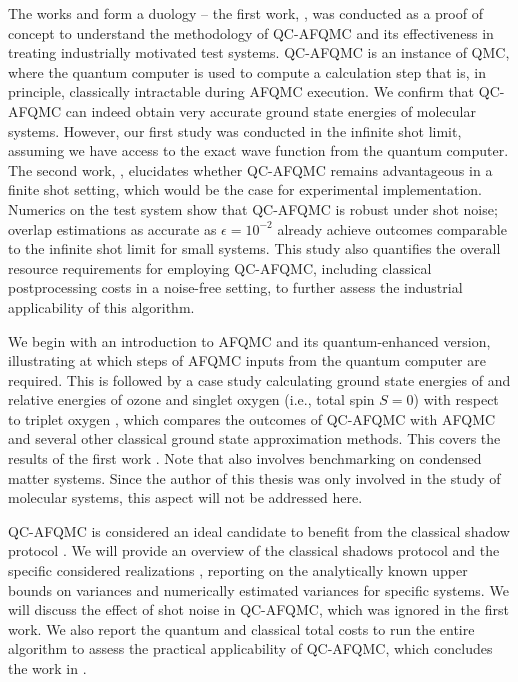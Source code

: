 \documentclass[../main.tex]{subfiles}
\begin{document}
The works \cite{amsler2023classical} and \cite{kiser2024classical} form a duology -- the first work, \cite{amsler2023classical}, was conducted as a proof of concept to understand the methodology of \ac{QC-AFQMC} \cite{huggins2022unbiasing}  and its effectiveness in treating industrially motivated test systems.  \ac{QC-AFQMC} is an instance of \ac{QMC}, where the quantum computer is used to compute a calculation step that is, in principle, classically intractable during \ac{AFQMC} execution.
We confirm that \ac{QC-AFQMC} can indeed obtain very accurate ground state energies of molecular systems. However, our first study was conducted in the infinite shot limit, assuming we have access to the exact wave function from the quantum computer. The second work, \cite{kiser2024classical}, elucidates whether \ac{QC-AFQMC} remains advantageous in a finite shot setting, which would be the case for experimental implementation. Numerics on the test system show that QC-AFQMC is robust under shot noise; overlap estimations as accurate as $\epsilon=10^{-2}$ already achieve outcomes comparable to the infinite shot limit for small systems. This study also quantifies the overall resource requirements for employing \ac{QC-AFQMC}, including classical postprocessing costs in a noise-free setting, to further assess the industrial applicability of this algorithm.

We begin with an introduction to \ac{AFQMC} and its quantum-enhanced version, illustrating at which steps of \ac{AFQMC} inputs from the quantum computer are required. This is followed by a case study calculating ground state energies of  and relative energies of ozone  and singlet oxygen  (i.e., total spin $S=0$) with respect to triplet oxygen , which compares the outcomes of \ac{QC-AFQMC} with \ac{AFQMC} and several other classical ground state approximation methods. This covers the results of the first work \cite{amsler2023classical}. Note that \cite{amsler2023classical} also involves benchmarking on condensed matter systems. Since the author of this thesis was only involved in the study of molecular systems, this aspect will not be addressed here.

\ac{QC-AFQMC} is considered an ideal candidate to benefit from the classical shadow protocol \cite{huang2020predicting}. We will provide an overview of the classical shadows protocol \cite{huang2020predicting} and the specific considered realizations \cite{wan2022matchgate, low2022classical}, reporting on the analytically known upper bounds on variances and numerically estimated variances for specific systems. We will discuss the effect of shot noise in \ac{QC-AFQMC}, which was ignored in the first work. We also report the quantum and classical total costs to run the entire algorithm to assess the practical applicability of \ac{QC-AFQMC}, which concludes the work in \cite{kiser2024classical}.
\end{document}

